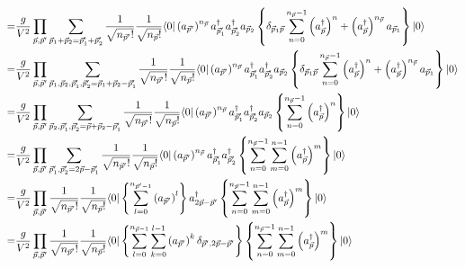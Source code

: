 \documentclass{assignment}
\begin{document}
\begin{pf}
\begin{itemize}
{\begin{align}
            \notag=&\frac{g}{V^2}\prod_{\vec{p},\vec{p}'}\sum_{\vec{p}_1+\vec{p}_2=\vec{p}_1'+\vec{p}_2'}\frac{1}{\sqrt{n_{\vec{p}'}!}}\frac{1}{\sqrt{n_{\vec{p}}!}}\langle 0\rvert \left(a_{\vec{p}'}\right)^{n_{\vec{p}}}a_{\vec{p}_1'}^{\dagger}a_{\vec{p}_2'}^{\dagger}a_{\vec{p}_2}\left\{\delta_{\vec{p}_1\vec{p}}\sum_{n=0}^{n_{\vec{p}}-1}\left(a_{\vec{p}}^{\dagger}\right)^n+\left(a_{\vec{p}}^{\dagger}\right)^{n_{\vec{p}}}a_{\vec{p}_1}\right\}\lvert 0\rangle\\
            \notag=&\frac{g}{V^2}\prod_{\vec{p},\vec{p}'}\sum_{\vec{p}_1,\vec{p}_2,\vec{p}_1',\vec{p}_2'=\vec{p}_1+\vec{p}_2-\vec{p}_1'}\frac{1}{\sqrt{n_{\vec{p}'}!}}\frac{1}{\sqrt{n_{\vec{p}}!}}\langle 0\rvert \left(a_{\vec{p}'}\right)^{n_{\vec{p}}}a_{\vec{p}_1'}^{\dagger}a_{\vec{p}_2'}^{\dagger}a_{\vec{p}_2}\left\{\delta_{\vec{p}_1\vec{p}}\sum_{n=0}^{n_{\vec{p}}-1}\left(a_{\vec{p}}^{\dagger}\right)^n+\left(a_{\vec{p}}^{\dagger}\right)^{n_{\vec{p}}}a_{\vec{p}_1}\right\}\lvert 0\rangle\\
            \notag=&\frac{g}{V^2}\prod_{\vec{p},\vec{p}'}\sum_{\vec{p}_2,\vec{p}_1',\vec{p}_2'=\vec{p}+\vec{p}_2-\vec{p}_1'}\frac{1}{\sqrt{n_{\vec{p}'}!}}\frac{1}{\sqrt{n_{\vec{p}}!}}\langle 0\rvert \left(a_{\vec{p}'}\right)^{n_{\vec{p}}}a_{\vec{p}_1'}^{\dagger}a_{\vec{p}_2'}^{\dagger}a_{\vec{p}_2}\left\{\sum_{n=0}^{n_{\vec{p}}-1}\left(a_{\vec{p}}^{\dagger}\right)^n\right\}\lvert 0\rangle\\
            \notag=&\frac{g}{V^2}\prod_{\vec{p},\vec{p}'}\sum_{\vec{p}_1',\vec{p}_2'=2\vec{p}-\vec{p}_1'}\frac{1}{\sqrt{n_{\vec{p}'}!}}\frac{1}{\sqrt{n_{\vec{p}}!}}\langle 0\rvert \left(a_{\vec{p}'}\right)^{n_{\vec{p}}}a_{\vec{p}_1'}^{\dagger}a_{\vec{p}_2'}^{\dagger}\left\{\sum_{n=0}^{n_{\vec{p}}-1}\sum_{m=0}^{n-1}\left(a_{\vec{p}}^{\dagger}\right)^m\right\}\lvert 0\rangle\\
            \notag=&\frac{g}{V^2}\prod_{\vec{p},\vec{p}'}\frac{1}{\sqrt{n_{\vec{p}'}!}}\frac{1}{\sqrt{n_{\vec{p}}!}}\langle 0\rvert\left\{\sum_{l=0}^{n_{\vec{p}'-1}}\left(a_{\vec{p}'}\right)^l\right\}a_{2\vec{p}-\vec{p}'}^{\dagger}\left\{\sum_{n=0}^{n_{\vec{p}}-1}\sum_{m=0}^{n-1}\left(a_{\vec{p}}^{\dagger}\right)^m\right\}\lvert 0\rangle\\
            \notag=&\frac{g}{V^2}\prod_{\vec{p},\vec{p}'}\frac{1}{\sqrt{n_{\vec{p}'}!}}\frac{1}{\sqrt{n_{\vec{p}}!}}\langle 0\rvert\left\{\sum_{l=0}^{n_{\vec{p}-1}}\sum_{k=0}^{l-1}\left(a_{\vec{p}'}\right)^k\delta_{\vec{p}',2\vec{p}-\vec{p}'}\right\}\left\{\sum_{n=0}^{n_{\vec{p}}-1}\sum_{m=0}^{n-1}\left(a_{\vec{p}}^{\dagger}\right)^m\right\}\lvert 0\rangle\\

\end{align}}
\end{itemize}
\end{pf}
\end{document}
